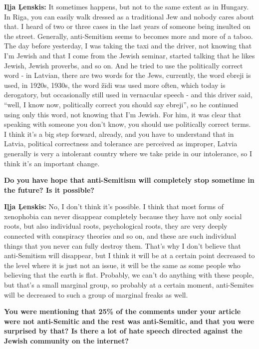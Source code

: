 \textbf{Iļja Ļenskis:} It sometimes happens, but not to the same extent as in Hungary. In Riga, you can easily walk dressed as a traditional Jew and nobody cares about that. I heard of two or three cases in the last years of someone being insulted on the street. Generally, anti-Semitism seems to becomes more and more of a taboo. The day before yesterday, I was taking the taxi and the driver, not knowing that I’m Jewish and that I come from the Jewish seminar, started talking that he likes Jewish, Jewish proverbs, and so on. And he tried to use the politically correct word - in Latvian, there are two words for the Jews, currently, the word ebreji is used, in 1920s, 1930s, the word žīdi was used more often, which today is derogatory, but occasionally still used in vernacular speech - and this driver said, ``well, I know now, politically correct you should say ebreji'', so he continued using only this word, not knowing that I’m Jewish. For him, it was clear that speaking with someone you don’t know, you should use politically correct terms. I think it’s a big step forward, already, and you have to understand that in Latvia, political correctness and tolerance are perceived as improper, Latvia generally is very a intolerant country where we take pride in our intolerance, so I think it’s an important change. 

\textbf{Do you have hope that anti-Semitism will completely stop sometime in the future? Is it possible?} 

\textbf{Iļja Ļenskis:} No, I don’t think it’s possible. I think that most forms of xenophobia can never disappear completely because they have not only social roots, but also individual roots, psychological roots, they are very deeply connected with conspiracy theories and so on, and these are such individual things that you never can fully destroy them. That’s why I don’t believe that anti-Semitism will disappear, but I think it will be at a certain point decreased to the level where it is just not an issue, it will be the same as some people who believing that the earth is flat. Probably, we can’t do anything with these people, but that’s a small marginal group, so probably at a certain moment, anti-Semites will be decreased to such a group of marginal freaks as well. 

\textbf{You were mentioning that 25\% of the comments under your article were not anti-Semitic and the rest was anti-Semitic, and that you were surprised  by that? Is there a lot of hate speech directed against the Jewish community on the internet?} 

